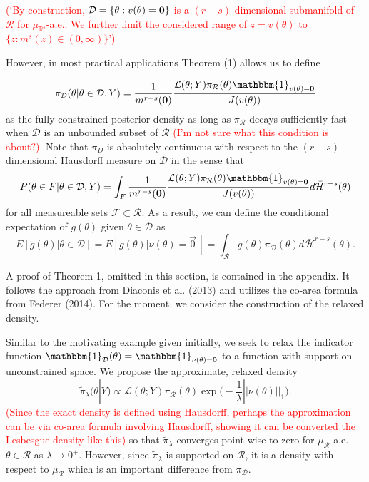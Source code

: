 \documentclass[12 point]{article}
\newcommand{\leo}[1]{\textcolor{red}{ (#1)}}
\begin{document}
\leo{`By construction, $\mathcal D = \{\theta:v(\theta)=\bf 0\}$ is a  $(r-s)$ dimensional submanifold of $\mathcal{R}$ for $\mu_{\mathbb{R}^s}$-a.e..
We further limit the considered range of  $z= v(\theta)$ to  $\{z:m^{s}(z)\in(0,\infty)\}$'}


 However, in most practical applications  Theorem (1) allows us to define 

\begin{equation}
\label{EQ:Constrained_rcp}
\pi_\mathcal{D}(\theta|\theta\in\mathcal{D},Y) = \frac{1}{m^{r-s}(\bf{0})} \frac{\mathcal{L}(\theta; Y) \pi_\mathcal{R}(\theta) \mathbbm{1}_{v(\theta)=\bf{0}}}{J(v(\theta))}
\end{equation} 
as the fully constrained posterior density as long as $\pi_\mathcal{R}$ decays sufficiently fast when $\mathcal{D}$ is an unbounded subset of $\mathcal{R
}$ \leo{I'm not sure what this condition is about?}.
  Note that $\pi_D$ is absolutely continuous with respect to the $(r-s)$-dimensional Hausdorff measure on $\mathcal{D}$ in the sense that $$P(\theta \in F|\theta\in\mathcal{D},Y) =  \int_F \frac{1}{m^{r-s}(\bf{0})} \frac{\mathcal{L}(\theta; Y) \pi_\mathcal{R}(\theta) \mathbbm{1}_{v(\theta)=\bf{0}}}{J(v(\theta))}d\bar{\mathcal{H}}^{r-s}(\theta)$$ for all measureable sets $\mathcal{F}\subset \mathcal{R}$. As a result, we can define the conditional  expectation of $g(\theta)$ given $\theta \in \mathcal{D}$ as 
$$E[g(\theta) | \theta\in\mathcal{D}] = E[g(\theta) | \nu(\theta) =\vec{0}\,] = \int_\mathcal{R} g(\theta) \pi_\mathcal{D}(\theta) d\bar{\mathcal{H}}^{r-s}(\theta).$$

A proof of Theorem 1, omitted in this section, is contained in the appendix. It follows the approach from Diaconis et al. (2013) and utilizes the co-area formula from Federer (2014). For the moment, we consider the construction of the relaxed density.

Similar to the motivating example given initially, we seek to relax the indicator function $\mathbbm{1}_\mathcal{D}(\theta) = \mathbbm{1}_{\nu(\theta)=\bf{0}}$ to a function with support on unconstrained space.  We propose the approximate, relaxed density
\begin{equation}
\label{EQ:Relaxed_rcp}
\tilde{\pi}_\lambda(\theta|Y) \propto  \mathcal{L}(\theta; Y) \pi_\mathcal{R}(\theta) \exp\bigg(-\frac{1}{\lambda}||\nu(\theta)||_1\bigg) .
\end{equation}
\leo{Since the exact density is defined using Hausdorff, perhaps the approximation
can be via  co-area formula involving Hausdorff, showing it can be converted the
Lesbesgue density like this}
so that $\tilde{\pi}_\lambda$ converges point-wise to zero for $\mu_\mathcal{R}$-a.e. $\theta\in\mathcal{R}$ as $\lambda\to 0^+.$  However, since $\tilde{\pi}_\lambda$ is supported on $\mathcal{R}$, it is a density with respect to $\mu_\mathcal{R}$ which is an important difference from $\pi_\mathcal{D}$. 
\end{document}
